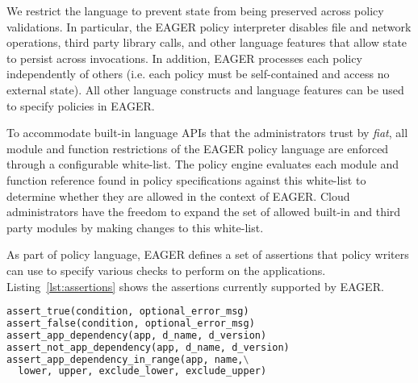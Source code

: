 We restrict the language to prevent state from being preserved across
policy validations. In particular, the EAGER policy interpreter disables 
file and network operations, third party library calls, 
and other language features that allow
state to persist across invocations.  
In addition, EAGER processes each 
policy independently of others (i.e. each policy must be self-contained and 
access no external state).  All other language constructs and 
language features can be used to specify policies in EAGER.

To accommodate built-in language APIs that the administrators trust by {\em fiat},
all module and function restrictions of the EAGER policy language are enforced
through a configurable white-list. The policy engine evaluates each module and function
reference found in policy specifications
against this white-list to determine whether they are allowed in the context of
EAGER. Cloud administrators have the freedom
to expand the set of allowed built-in and third party modules by making
changes to this white-list.

As part of policy language, EAGER
defines a set of assertions that policy writers can use to specify various 
checks to perform on the applications. 
Listing~\ref{lst:assertions} shows the assertions currently supported by EAGER.

{\footnotesize 
\begin{lstlisting}[language=Python, frame=single, 
caption={Assertions supported by the EAGER policy language.}, label={lst:assertions}]
assert_true(condition, optional_error_msg)
assert_false(condition, optional_error_msg)
assert_app_dependency(app, d_name, d_version)
assert_not_app_dependency(app, d_name, d_version)
assert_app_dependency_in_range(app, name,\
  lower, upper, exclude_lower, exclude_upper)
\end{lstlisting}
}


